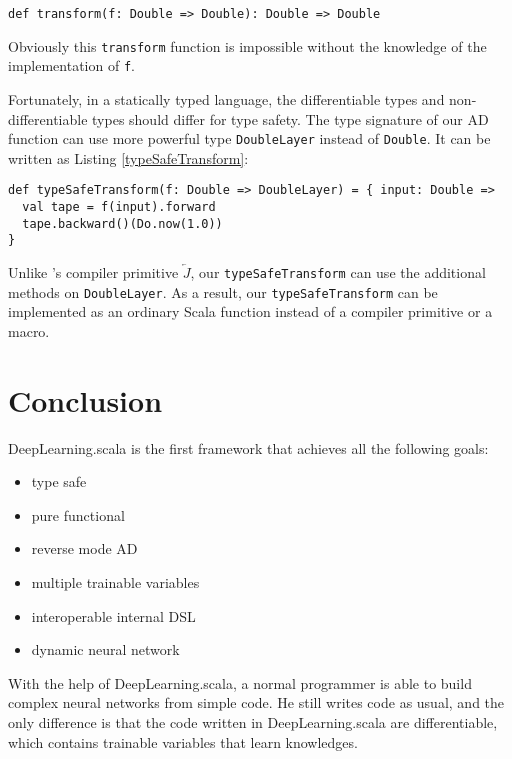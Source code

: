 \begin{lstlisting}[float={htbp},caption={Impossible transform function for AD}, label={transform}]
def transform(f: Double => Double): Double => Double
\end{lstlisting}

Obviously this \lstinline{transform} function is impossible without the knowledge of the implementation of \lstinline{f}.

Fortunately, in a statically typed language, the differentiable types and non-differentiable types should differ for type safety. The type signature of our AD function can use more powerful type \lstinline{DoubleLayer} instead of \lstinline{Double}. It can be written as Listing \ref{typeSafeTransform}:

\begin{lstlisting}[float={htbp},caption={Type safe transform function for AD}, label={typeSafeTransform}]
def typeSafeTransform(f: Double => DoubleLayer) = { input: Double =>
  val tape = f(input).forward
  tape.backward()(Do.now(1.0))
}
\end{lstlisting}

Unlike \cite{pearlmutter2008reverse}'s compiler primitive $\overleftarrow{J}$, our \lstinline{typeSafeTransform} can use the additional methods on \lstinline{DoubleLayer}. As a result, our \lstinline{typeSafeTransform} can be implemented as an ordinary Scala function instead of a compiler primitive or a macro.

\section{Conclusion}

DeepLearning.scala is the first framework that achieves all the following goals:

\begin{itemize}
  \item type safe
  \item pure functional
  \item reverse mode AD
  \item multiple \glspl{trainable variable}
  \item interoperable internal DSL
  \item dynamic neural network
\end{itemize}

With the help of DeepLearning.scala, a normal programmer is able to build complex neural networks from simple code. He still writes code as usual, and the only difference is that the code written in DeepLearning.scala are differentiable, which contains \glspl{trainable variable} that learn knowledges.

\clearpage
\appendix

\printglossary

\begin{acks}
\end{acks}


